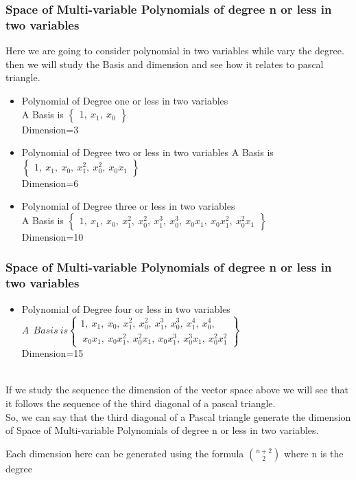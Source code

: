 \documentclass{beamer}
\begin{document}
\begin{frame}
\frametitle{Space of Multi-variable Polynomials of degree n or less in two variables}
\begin{block}{}
Here we are going to consider polynomial in two variables while vary the degree. then we will study the Basis and dimension and see how it relates to pascal triangle.
\begin{itemize}
\item Polynomial of Degree one or less in two variables\\
A Basis is $\begin{Bmatrix}1,~ x_1,~ x_0
\end{Bmatrix}$\\
Dimension=3\\
\item Polynomial of Degree two or less in two variables 
A Basis is $\begin{Bmatrix}1,~ x_1,~ x_0,~ x_1^2,~ x_0^2,~ x_0x_1
\end{Bmatrix}$\\
Dimension=6\\
\item Polynomial of Degree three or less in two variables \\
A Basis is $\begin{Bmatrix}1,~ x_1,~ x_0,~ x_1^2,~ x_0^2,~ x_1^3,~ x_0^3,~ x_0x_1,~ x_0x_1^2,~ x_0^2x_1
\end{Bmatrix}$\\
Dimension=10\\
\end{itemize}
\end{block}
\end{frame}
\begin{frame}
\frametitle{Space of Multi-variable Polynomials of degree n or less in two variables}
\begin{block}{}

\begin{itemize} 
\item Polynomial of Degree four or less in two variables 
$A~~Basis ~is \begin{Bmatrix}1,~ x_1,~ x_0,~ x_1^2,~ x_0^2,~ x_1^3,~ x_0^3,~ x_1^4,~ x_0^4,\\~ x_0x_1,~ x_0x_1^2,~ x_0^2x_1,~ x_0x_1^3,~ x_0^3x_1,~ x_0^2x_1^2
\end{Bmatrix}$\\
Dimension=15\\
\end{itemize}
\\
If we study the sequence the dimension of the vector space above we will see that it follows the sequence of the third diagonal of a pascal triangle.\\
So, we can say that the third diagonal of a Pascal triangle generate the dimension of Space of Multi-variable Polynomials of degree n or less in two variables.

Each dimension here can be generated using the formula $n+2 \choose 2$ where n is the degree
\end{block}
\end{frame}
\end{document}
